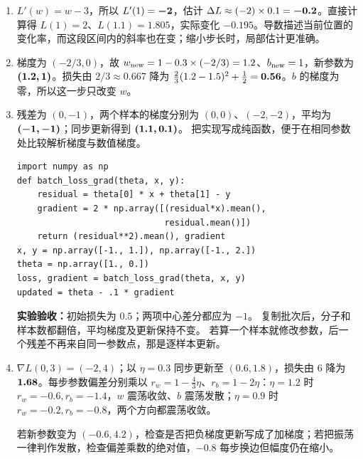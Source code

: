 \begin{enumerate}[label={},leftmargin=4.8em,itemsep=4pt]
\item[\textbf{\hyperref[exercise:local-derivative-change]{C-007.}}] \leavevmode{}\label{solution:C-007}\label{solution:local-derivative-change}$L'(w)=w-3$，所以 $L'(1)=\boldsymbol{-2}$，估计 $\Delta L\approx(-2)\times0.1=\boldsymbol{-0.2}$。直接计算得 $L(1)=2$、$L(1.1)=1.805$，实际变化 $-0.195$。导数描述当前位置的变化率，而这段区间内的斜率也在变；缩小步长时，局部估计更准确。
\item[\textbf{\hyperref[exercise:synchronous-gradient-step]{C-008.}}] \leavevmode{}\label{solution:C-008}\label{solution:synchronous-gradient-step}梯度为 $(-2/3,0)$，故 $w_{\rm new}=1-0.3\times(-2/3)=1.2$、$b_{\rm new}=1$，新参数为 $\boldsymbol{(1.2,1)}$。损失由 $2/3\approx0.667$ 降为 $\tfrac23(1.2-1.5)^2+\tfrac12=\boldsymbol{0.56}$。$b$ 的梯度为零，所以这一步只改变 $w$。
\item[\textbf{\hyperref[exercise:mini-batch-gradient-average]{C-009.}}] \leavevmode{}\label{solution:C-009}\label{solution:mini-batch-gradient-average}残差为 $(0,-1)$，两个样本的梯度分别为 $(0,0)$、$(-2,-2)$，平均为 $\boldsymbol{(-1,-1)}$；同步更新得到 $\boldsymbol{(1.1,0.1)}$。
把实现写成纯函数，便于在相同参数处比较解析梯度与数值梯度。\par\nobreak
\begin{samepage}\begin{verbatim}
import numpy as np
def batch_loss_grad(theta, x, y):
    residual = theta[0] * x + theta[1] - y
    gradient = 2 * np.array([(residual*x).mean(),
                             residual.mean()])
    return (residual**2).mean(), gradient
x, y = np.array([-1., 1.]), np.array([-1., 2.])
theta = np.array([1., 0.])
loss, gradient = batch_loss_grad(theta, x, y)
updated = theta - .1 * gradient
\end{verbatim}\end{samepage}
\textbf{实验验收：}初始损失为 $0.5$；两项中心差分都应为 $-1$。
复制批次后，分子和样本数都翻倍，平均梯度及更新保持不变。
若算一个样本就修改参数，后一个残差不再来自同一参数点，那是逐样本更新。
\item[\textbf{\hyperref[exercise:quadratic-gradient-transfer]{C-010.}}] \leavevmode{}\label{solution:C-010}\label{solution:quadratic-gradient-transfer}$\nabla L(0,3)=(-2,4)$；以 $\eta=0.3$ 同步更新至 $(0.6,1.8)$，损失由 $6$ 降为 $\boldsymbol{1.68}$。每步参数偏差分别乘以 $r_w=1-\tfrac43\eta$、$r_b=1-2\eta$：$\eta=1.2$ 时 $r_w=-0.6,r_b=-1.4$，$w$ 震荡收敛、$b$ 震荡发散；$\eta=0.9$ 时 $r_w=-0.2,r_b=-0.8$，两个方向都震荡收敛。\par 若新参数变为 $(-0.6,4.2)$，检查是否把负梯度更新写成了加梯度；若把振荡一律判作发散，检查偏差乘数的绝对值，$-0.8$ 每步换边但幅度仍在缩小。

\end{enumerate}
